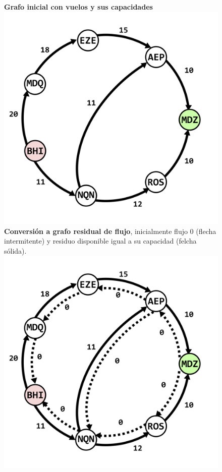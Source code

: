 \documentclass[../tp3_grupo404.tex]{subfiles}
\begin{document}
\begin{figure}[H]
    \centering
    \subcaptionbox
        {\label{fig:Vuelos1}\textbf{Grafo inicial con vuelos y sus capacidades}}
        {\includegraphics[width=0.4\linewidth,angle=0,origin=c]{out/ejA1.png}}
    \subcaptionbox
        {\label{fig:Vuelos2}\textbf{Conversión a grafo residual de flujo}, inicialmente flujo 0
        (flecha intermitente) y residuo disponible igual a su capacidad (felcha sólida).}
        {\includegraphics[width=0.4\linewidth,angle=0,origin=c]{out/ejA2.png}}
\end{figure}
\end{document}
